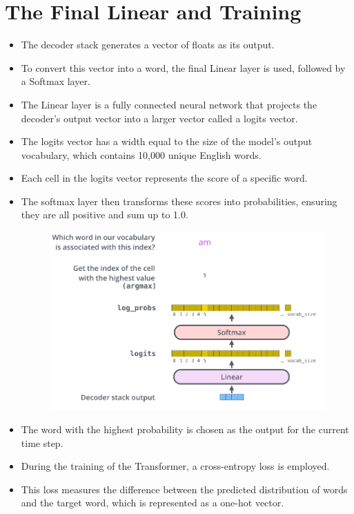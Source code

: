 \section{The Final Linear and Training}
\begin{itemize}
 \item The decoder stack generates a vector of floats as its output.
 \item To convert this vector into a word, the final Linear layer is used, followed by a Softmax layer. 
 \item The Linear layer is a fully connected neural network that projects the decoder's output vector into a larger vector called a logits vector. 
 \item The logits vector has a width equal to the size of the model's output vocabulary, which contains 10,000 unique English words.
 \item Each cell in the logits vector represents the score of a specific word. 
 \item The softmax layer then transforms these scores into probabilities, ensuring they are all positive and sum up to 1.0. 

  \begin{figure}[h]
        	\includegraphics[scale = 0.2]{pics/transformer_decoder_output_softmax.png}
        \end{figure}  
 \item The word with the highest probability is chosen as the output for the current time step. 
\item During the training of the Transformer, a cross-entropy loss is employed. 
\item This loss measures the difference between the predicted distribution of words and the target word, which is represented as a one-hot vector.
 
 
\end{itemize}


